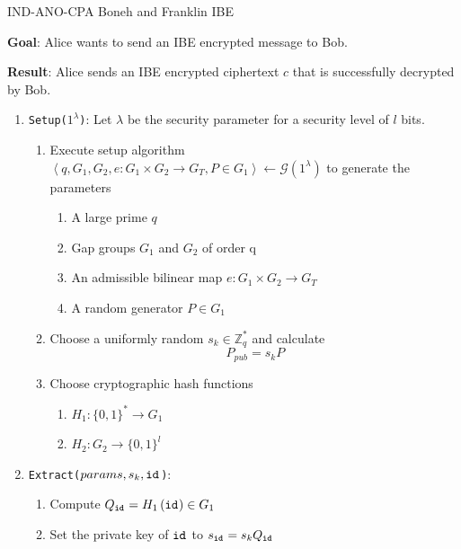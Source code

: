 \begin{algorithm}
\caption{IND-ANO-CPA Boneh and Franklin IBE~\cite{art:BonehF01}}
\label{alg:basic_indent}
\begin{description}
 \item \textbf{Goal}: Alice wants to send an IBE encrypted message to Bob.
 
 \item \textbf{Result}: Alice sends an IBE encrypted ciphertext $c$ that is successfully decrypted by Bob.
\end{description}
 \begin{enumerate}
  \item \texttt{Setup($1^{\lambda}$)}: Let $\lambda$ be the security parameter for a security level of $l$ bits.
  \begin{enumerate}
   \item Execute setup algorithm $\left< q, G_1, G_2, e: G_1 \times G_2 \rightarrow G_T, P \in G_1 \right> \leftarrow \mathcal{G} \left( 1^{\lambda} \right)$ to generate the parameters
    \begin{enumerate}
     \item A large prime $q$
     \item Gap groups $G_1$ and $G_2$ of order q
     \item An admissible bilinear map $e: G_1 \times G_2 \rightarrow G_T$
     \item A random generator $P \in G_1$
   \end{enumerate}
   \item Choose a uniformly random $s_k \in \mathbb{Z}^{*}_q$ and calculate
   \begin{equation*}
    P_{pub} = s_k P
   \end{equation*}
   \item Choose cryptographic hash functions
    \begin{enumerate}
     \item $H_1: \{ 0,1  \}^* \rightarrow G_1$
     \item $H_2: G_2 \rightarrow \{ 0,1 \}^l$
    \end{enumerate}
  \end{enumerate}
  \item \texttt{Extract($params, s_k, \mathtt{id}_{}$)}:
   \begin{enumerate}
    \item Compute $Q_{\mathtt{id}_{}} = H_1 \left( \mathtt{id}_{} \right) \in G_1$
    \item Set the private key of $\mathtt{id}_{}$ to $s_{\mathtt{id}_{}} = s_k Q_{\mathtt{id}_{}}$

\end{enumerate}
\end{enumerate}
\end{algorithm}
